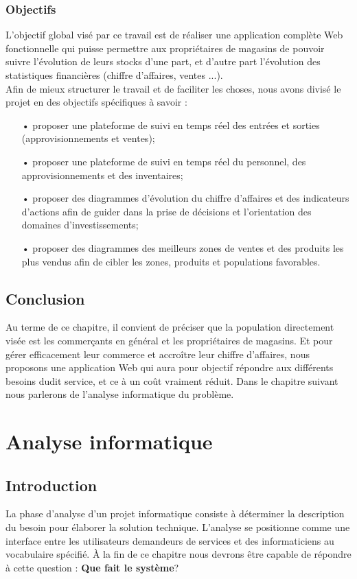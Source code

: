 \documentclass[12pt]{report}
\begin{document}
	\subsection{Objectifs}
	  L’objectif global visé par ce travail est de réaliser une application complète Web fonctionnelle qui puisse permettre aux propriétaires de magasins de pouvoir suivre l’évolution de leurs stocks d’une part, et d’autre part l’évolution des statistiques financières (chiffre d’affaires, ventes ...).
	  \\Afin de mieux structurer le travail et de faciliter les choses, nous avons divisé le projet en des objectifs spécifiques à savoir :
	  \begin{itemize}
	    \item[•] proposer une plateforme de suivi en temps réel des entrées et sorties (approvisionnements et ventes);
	    \item[•] proposer une plateforme de suivi en temps réel du personnel, des approvisionnements et des inventaires;
	    \item[•] proposer des diagrammes d'évolution du chiffre d'affaires et des indicateurs d'actions afin de guider dans la prise de décisions et l'orientation des domaines d'investissements;
	    \item[•] proposer des diagrammes des meilleurs zones de ventes et des produits les plus vendus afin de cibler les zones, produits et populations favorables.
	  \end{itemize}
     
      \section{Conclusion}
      Au terme de ce chapitre, il convient de préciser que la population directement visée est les commerçants en général et les propriétaires de magasins. Et pour gérer efficacement leur commerce et accroître leur chiffre d'affaires, nous proposons une application Web qui aura pour objectif répondre aux différents besoins dudit service, et ce à un coût vraiment réduit. Dans le chapitre suivant nous parlerons de l'analyse informatique du problème.

    \chapter{Analyse informatique}
      \section{Introduction}
	La phase d'analyse d'un projet informatique consiste à déterminer la description du besoin pour élaborer la solution technique. L'analyse se positionne comme une interface entre les utilisateurs demandeurs de services et des informaticiens au vocabulaire spécifié. À la fin de ce chapitre nous devrons être capable de répondre à cette question : \textbf{Que fait le système}? \cite{ib}
	
\end{document}
